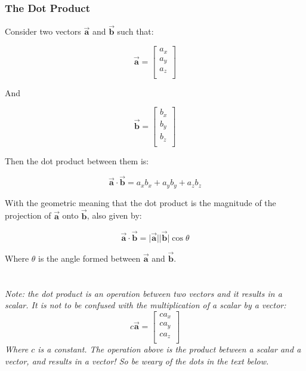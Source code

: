 \documentclass[11pt]{article}
\begin{document}
\subsubsection{The Dot Product}
Consider two vectors $\vec{\bm{a}}$ and $\vec{\bm{b}}$ such that:

\begin{equation*}
    \vec{\bm{a}} = \begin{bmatrix}
        a_x \\
        a_y \\
        a_z \\
    \end{bmatrix}
\end{equation*}

And

\begin{equation*}
    \vec{\bm{b}} = \begin{bmatrix}
        b_x \\
        b_y \\
        b_z \\
    \end{bmatrix}
\end{equation*}

\noindent
Then the dot product between them is:

\begin{equation*}
    \vec{\bm{a}} \cdot \vec{\bm{b}} = a_xb_x + a_yb_y + a_zb_z
\end{equation*}

\noindent
With the geometric meaning that the dot product is the magnitude of the projection of $\vec{\bm{a}}$ onto $\vec{\bm{b}}$, also given by:

\begin{equation*}
    \vec{\bm{a}} \cdot \vec{\bm{b}} = \lvert\vec{\bm{a}}\rvert \lvert\vec{\bm{b}}\rvert\cos{\theta}
\end{equation*}

\noindent
Where $\theta$ is the angle formed between $\vec{\bm{a}}$ and $\vec{\bm{b}}$.\\ \\ \\
\noindent
\emph{Note: the dot product is an operation between two vectors and it results in a scalar. It is not to be confused with the multiplication of a scalar by a vector:}
\begin{equation*}
    c\vec{\bm{a}} = \begin{bmatrix}
        ca_x \\
        ca_y \\
        ca_z \\
    \end{bmatrix}
\end{equation*}
\emph{Where $c$ is a constant. The operation above is the product between a scalar and a vector, and results in a vector! So be weary of the dots in the text below.}
\end{document}
